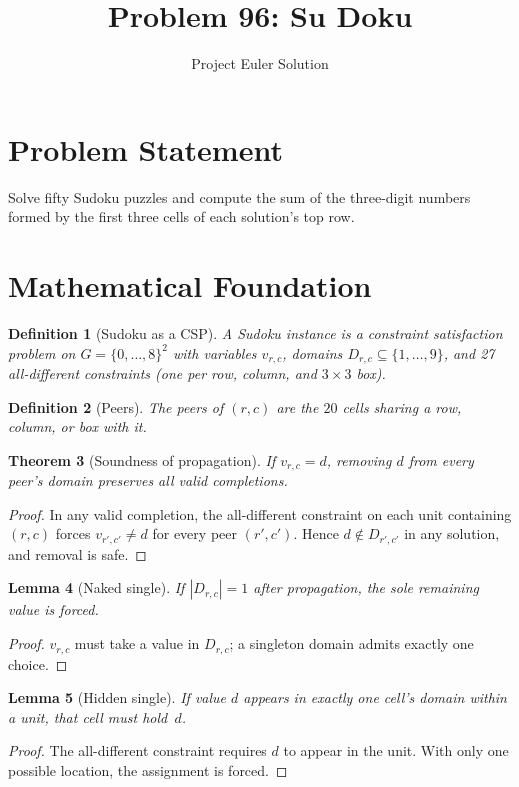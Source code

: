 \documentclass[12pt]{article}
\title{Problem 96: Su Doku}
\author{Project Euler Solution}
\date{}
\newtheorem{theorem}{Theorem}
\newtheorem{lemma}[theorem]{Lemma}
\newtheorem{definition}[theorem]{Definition}
\begin{document}
\maketitle

\section{Problem Statement}
Solve fifty Sudoku puzzles and compute the sum of the three-digit numbers formed by the first three cells of each solution's top row.

\section{Mathematical Foundation}

\begin{definition}[Sudoku as a CSP]
A Sudoku instance is a constraint satisfaction problem on $G = \{0,\ldots,8\}^2$ with variables $v_{r,c}$, domains $D_{r,c} \subseteq \{1,\ldots,9\}$, and 27 all-different constraints (one per row, column, and $3 \times 3$ box).
\end{definition}

\begin{definition}[Peers]
The \emph{peers} of $(r,c)$ are the $20$ cells sharing a row, column, or box with it.
\end{definition}

\begin{theorem}[Soundness of propagation]
\label{thm:prop}
If $v_{r,c} = d$, removing $d$ from every peer's domain preserves all valid completions.
\end{theorem}
\begin{proof}
In any valid completion, the all-different constraint on each unit containing $(r,c)$ forces $v_{r',c'} \ne d$ for every peer $(r',c')$. Hence $d \notin D_{r',c'}$ in any solution, and removal is safe.
\end{proof}

\begin{lemma}[Naked single]
If $|D_{r,c}| = 1$ after propagation, the sole remaining value is forced.
\end{lemma}
\begin{proof}
$v_{r,c}$ must take a value in $D_{r,c}$; a singleton domain admits exactly one choice.
\end{proof}

\begin{lemma}[Hidden single]
If value $d$ appears in exactly one cell's domain within a unit, that cell must hold~$d$.
\end{lemma}
\begin{proof}
The all-different constraint requires $d$ to appear in the unit. With only one possible location, the assignment is forced.
\end{proof}
\end{document}
